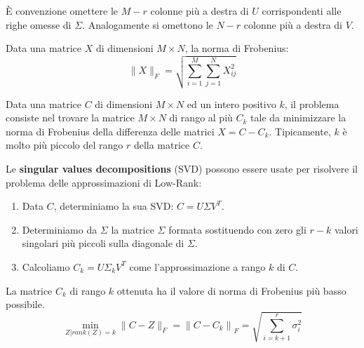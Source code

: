 \documentclass[\main/main.tex]{subfiles}
\begin{document}
\begin{multicols}{2}
\begin{definition}
    È convenzione omettere le \(M-r\) colonne più a destra di \(U\) corrispondenti alle righe omesse di \(\Sigma\). Analogamente si omettono le \(N - r\) colonne più a destra di \(V\).
\end{definition}
\begin{definition}
    Data una matrice \(X\) di dimensioni \(M \times N\), la norma di Frobenius:
    \[
        \|X\|_{F}=\sqrt{\sum_{i=1}^{M} \sum_{j=1}^{N} X_{i j}^{2}}
    \]
\end{definition}
\begin{problem}
    Data una matrice \(C\) di dimensioni \(M \times N\) ed un intero positivo \(k\), il problema consiste nel trovare la matrice \(M \times N\) di rango al più \(C_k\) tale da minimizzare la norma di Frobenius della differenza delle matrici \(X = C - C_k\). Tipicamente, \(k\) è molto più piccolo del rango \(r\) della matrice \(C\).
\end{problem}
\begin{analysis}
    Le \textbf{singular values decompositions} (SVD) possono essere usate per risolvere il problema delle approssimazioni di Low-Rank:
    \begin{enumerate}
        \item Data \(C\), determiniamo la sua SVD: \(C=U\Sigma V^T\).
        \item Determiniamo da \(\Sigma\) la matrice \(\Sigma\) formata sostituendo con zero gli \(r-k\) valori singolari più piccoli sulla diagonale di \(\Sigma\).
        \item Calcoliamo \(C_k = U \Sigma_k V^T\) come l'approssimazione a rango \(k\) di \(C\).
    \end{enumerate}
\end{analysis}
\begin{theorem}
    La matrice \(C_k\) di rango \(k\) ottenuta ha il valore di norma di Frobenius più basso possibile.
    \[
        \min _{Z | r a n k(Z)=k}\|C-Z\|_{F}=\left\|C-C_{k}\right\|_{F}=\sqrt{\sum_{i=k+1}^{r} \sigma_{i}^{2}}
    \]
\end{theorem}
\end{multicols}
\end{document}
